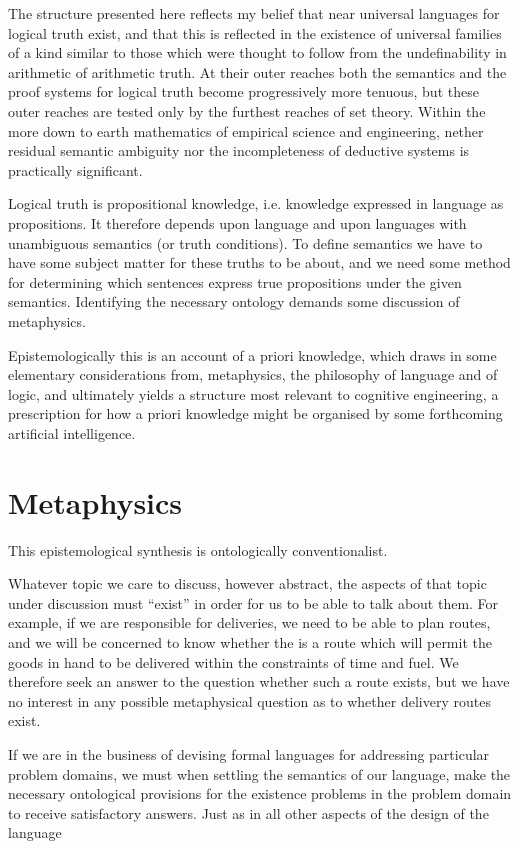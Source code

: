 \documentclass[10pt,titlepage]{book}
\begin{document}
The structure presented here reflects my belief that near universal languages for logical truth exist, and that this is reflected in the existence of universal families of a kind similar to those which were thought to follow from the undefinability in arithmetic of arithmetic truth.
At their outer reaches both the semantics and the proof systems for logical truth become progressively more tenuous, but these outer reaches are tested only by the furthest reaches of set theory.
Within the more down to earth mathematics of empirical science and engineering, nether residual semantic ambiguity nor the incompleteness of deductive systems is practically significant.

Logical truth is propositional knowledge, i.e. knowledge expressed in language as propositions.
It therefore depends upon language and upon languages with unambiguous semantics (or truth conditions).
To define semantics we have to have some subject matter for these truths to be about, and we need some method for determining which sentences express true propositions under the given semantics.
Identifying the necessary ontology demands some discussion of metaphysics.

Epistemologically this is an account of a priori knowledge, which draws in some elementary considerations from, metaphysics, the philosophy of language and of logic, and ultimately yields a structure most relevant to cognitive engineering, a prescription for how a priori knowledge might be organised by some forthcoming artificial intelligence.

\section{Metaphysics}

This epistemological synthesis is ontologically conventionalist.

Whatever topic we care to discuss, however abstract, the aspects of that topic under discussion must ``exist'' in order for us to be able to talk about them.
For example, if we are responsible for deliveries, we need to be able to plan routes, and we will be concerned to know whether the is a route which will permit the goods in hand to be delivered within the constraints of time and fuel.
We therefore seek an answer to the question whether such a route exists, but we have no interest in any possible metaphysical question as to whether delivery routes exist.

If we are in the business of devising formal languages for addressing particular problem domains, we must when settling the semantics of our language, make the necessary ontological provisions for the existence problems in the problem domain to receive satisfactory answers.
Just as in all other aspects of the design of the language
\end{document}
